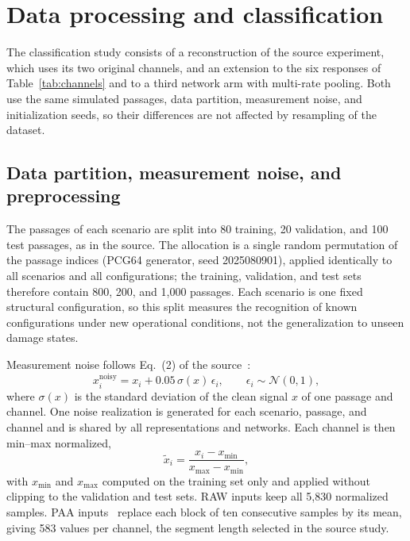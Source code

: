 \section{Data processing and classification}
\label{sec:methodology}

The classification study consists of a reconstruction of the source
experiment, which uses its two original channels, and an extension to the six
responses of Table~\ref{tab:channels} and to a third network arm with
multi-rate pooling. Both use the same simulated passages, data partition,
measurement noise, and initialization seeds, so their differences are not
affected by resampling of the dataset.

\subsection{Data partition, measurement noise, and preprocessing}
\label{sec:preprocessing}

The passages of each scenario are split into 80 training, 20 validation, and
100 test passages, as in the source. The allocation is a single random
permutation of the passage indices (PCG64 generator, seed 2025080901), applied
identically to all scenarios and all configurations; the training, validation,
and test sets therefore contain 800, 200, and 1,000 passages. Each scenario is
one fixed structural configuration, so this split measures the recognition of
known configurations under new operational conditions, not the generalization
to unseen damage states.

Measurement noise follows Eq.~(2) of the source~\cite{fernandes2025early}:
\begin{equation}
    x^{\mathrm{noisy}}_i=x_i+0.05\,\sigma(x)\,\epsilon_i,
    \qquad \epsilon_i\sim\mathcal{N}(0,1),
    \label{eq:noise}
\end{equation}
where $\sigma(x)$ is the standard deviation of the clean signal $x$ of one
passage and channel. One noise realization is generated for each scenario,
passage, and channel and is shared by all representations and networks. Each
channel is then min--max normalized,
\begin{equation}
    \tilde{x}_i=\frac{x_i-x_{\min}}{x_{\max}-x_{\min}},
\end{equation}
with $x_{\min}$ and $x_{\max}$ computed on the training set only and applied
without clipping to the validation and test sets. RAW inputs keep all 5,830
normalized samples. PAA inputs~\cite{keogh2001dimensionality} replace each
block of ten consecutive samples by its mean, giving 583 values per channel, the
segment length selected in the source study.

